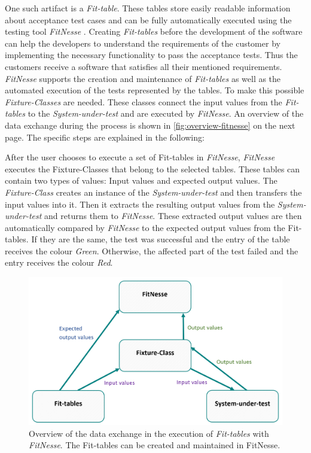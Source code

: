 One such artifact is a \textit{Fit-table}. 
These tables store easily readable information about acceptance test cases and can be fully automatically executed using the testing tool \textit{FitNesse} \cite{fitnesse}.
Creating \textit{Fit-tables} before the development of the software can help the developers to understand the requirements of the customer by implementing the necessary functionality to pass the acceptance tests.
Thus the customers receive a software that satisfies all their mentioned requirements.
\textit{FitNesse} supports the creation and maintenance of \textit{Fit-tables} as well as the automated execution of the tests represented by the tables.
To make this possible \textit{Fixture-Classes} are needed.
These classes connect the input values from the \textit{Fit-tables} to the \textit{System-under-test} and are executed by \textit{FitNesse}.
An overview of the data exchange during the process is shown in  \autoref{fig:overview-fitnesse} on the next page.
The specific steps are explained in the following:

After the user chooses to execute a set of Fit-tables in \textit{FitNesse}, \textit{FitNesse} executes the Fixture-Classes that belong to the selected tables.
These tables can contain two types of values: Input values and expected output values.
The \textit{Fixture-Class} creates an instance of the \textit{System-under-test} and then transfers the input values into it.
Then it extracts the resulting output values from the \textit{System-under-test} and returns them to \textit{FitNesse}.
These extracted output values are then automatically compared by \textit{FitNesse} to the expected output values from the Fit-tables.
If they are the same, the test was successful and the entry of the table receives the colour \textit{Green}.
Otherwise, the affected part of the test failed and the entry receives the colour \textit{Red}.

\begin{figure}[H]
	\centering
	\includegraphics[width=.7\textwidth]{../images/fitnesse-overview.png}
	\caption{Overview of the data exchange in the execution of \textit{Fit-tables} with \textit{FitNesse}. The Fit-tables can be created and maintained in FitNesse.}
	\label{fig:overview-fitnesse}
\end{figure}


